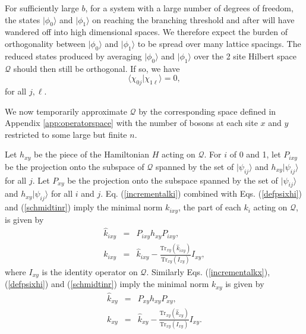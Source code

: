 \documentclass[12pt,amsmath,amssymb,onecolumn]{revtex4-2}
\begin{document}
For sufficiently large $b$, for a system with a large number
of degrees of freedom, the states $|\phi_0 \rangle $ and $|\phi_1 \rangle $
on reaching the branching threshold and after will have wandered off into high dimensional spaces.
We therefore expect
the burden of orthogonality between $|\phi_0 \rangle $ and $|\phi_1 \rangle $
to be spread over many lattice spacings.
The reduced states produced by averaging
$|\phi_0 \rangle $ and $|\phi_1 \rangle $
over the 2 site Hilbert space $\mathcal{Q}$
should then still be orthogonal.
If so, we have
\begin{equation}
  \label{schmidtinr}
   \langle  \chi_{0j} | \chi_{1\ell} \rangle  = 0,
\end{equation}
for all $j, \ell$.

We now temporarily approximate $\mathcal{Q}$ by the corresponding space defined
in Appendix \ref{app:operatorspace} with the number of bosons at each site $x$ and $y$
restricted to some large but finite $n$.

Let $h_{xy}$ be the piece of the Hamiltonian $H$ acting on $\mathcal{Q}$.
For $i$ of 0 and 1, let $P_{ixy}$ be the projection onto the subspace of $\mathcal{Q}$ spanned by
the set of $|\psi_{ij} \rangle $ and $h_{xy} |\psi_{ij} \rangle $ for all $j$.
Let $P_{xy}$ be the projection 
onto the subspace spanned by the set of $|\psi_{ij} \rangle $ and $h_{xy} |\psi_{ij} \rangle $ for all $i$ and $j$.
Eq. (\ref{incrementalki}) combined
with Eqs. (\ref{defpsixhi}) and (\ref{schmidtinr}) imply the minimal norm $k_{ixy}$, the part of each $k_i$
acting on $\mathcal{Q}$, is given by
\begin{subequations}
\begin{eqnarray}
  \label{hatkixy}
  \hat{k}_{ixy} & = & P_{ixy} h_{xy} P_{ixy}, \\
\label{optimalkixy}
  k_{ixy} & = & \hat{k}_{ixy} - \frac{\mathrm{Tr}_{xy} (\hat{k}_{ixy})}{\mathrm{Tr}_{xy} (I_{xy})} I_{xy},
\end{eqnarray}
\end{subequations}
where $I_{xy}$ is the identity operator on $\mathcal{Q}$.
Similarly Eqs. (\ref{incrementalkx}), (\ref{defpsixhi}) and (\ref{schmidtinr}) imply
the minimal norm $k_{xy}$ is given by
\begin{subequations}
\begin{eqnarray}
  \label{hatkxy}
  \hat{k}_{xy} & = & P_{xy} h_{xy} P_{xy}, \\
\label{optimalkxy}
  k_{xy} & = & \hat{k}_{xy} - \frac{\mathrm{Tr}_{xy} (\hat{k}_{xy})}{\mathrm{Tr}_{xy} (I_{xy})} I_{xy}.
\end{eqnarray}
\end{subequations}
\end{document}
